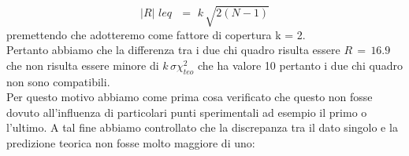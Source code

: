 \begin{equation*}
	|R| \,\,leq\,\,  \,\,=\,\, k \, \sqrt{2(N - 1)}
\end{equation*}
%
premettendo che adotteremo come fattore di copertura k = 2.\\

Pertanto abbiamo che la differenza tra i due chi quadro risulta essere $R \,=\, 16.9$ che non risulta essere minore di $k \, \sigma \chi_{teo}^2$ che ha valore 10  pertanto i due chi quadro non sono compatibili.\\
Per questo motivo abbiamo come prima cosa verificato che questo non fosse dovuto all'influenza di particolari punti sperimentali ad esempio il primo o l'ultimo. A tal fine abbiamo controllato che la discrepanza tra il dato singolo e la predizione teorica non fosse molto maggiore di uno:

